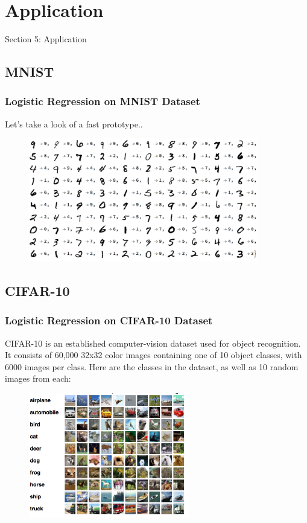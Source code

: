 \documentclass{beamer}
\begin{document}
\section{Application} 
\begin{frame}
\huge{\centerline{Section 5: Application}}
\end{frame}
\subsection{MNIST}
\begin{frame}
\frametitle{Logistic Regression on MNIST Dataset}
Let's take a look of a fast prototype..
\begin{figure}[t]
\includegraphics[width=10cm]{graphics/mnist}
\centering
\end{figure}
\end{frame}
\subsection{CIFAR-10}
\begin{frame}
\frametitle{Logistic Regression on CIFAR-10 Dataset}
CIFAR-10  is an established computer-vision dataset used for object recognition. It consists of 60,000 32x32 color images containing one of 10 object classes, with 6000 images per class. 
Here are the classes in the dataset, as well as 10 random images from each:
\begin{figure}[t]
\includegraphics[width=7cm]{graphics/cifar-10}
\centering
\end{figure}
\end{frame}
\end{document}
